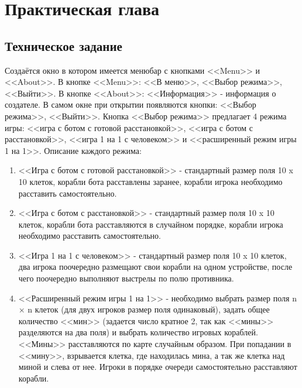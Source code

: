 \chapter{\label{ch:ch02}Практическая глава}
\section{\label{sec:ch02/sec01}Техническое задание}
Создаётся окно в котором имеется менюбар с кнопками <<Menu>> и <<About>>. В кнопке <<Menu>>: <<В меню>>, <<Выбор режима>>, <<Выйти>>. В кнопке <<About>>: <<Информация>> - информация о создателе. В самом окне при открытии появляются кнопки: <<Выбор режима>>, <<Выйти>>. Кнопка <<Выбор режима>> предлагает 4 режима игры: <<игра с ботом с готовой расстановкой>>, <<игра с ботом с расстановкой>>, <<игра 1 на 1 с человеком>> и <<расширенный режим игры 1 на 1>>. 
Описание каждого режима:
\begin{enumerate}
\item <<Игра с ботом с готовой расстановкой>> - стандартный размер поля 10 x 10 клеток, корабли бота расставлены заранее, корабли игрока необходимо расставить самостоятельно.
\item <<Игра с ботом с расстановкой>> - стандартный размер поля 10 x 10 клеток, корабли бота расставляются в случайном порядке, корабли игрока необходимо расставить самостоятельно.
\item <<Игра 1 на 1 с человеком>> - стандартный размер поля 10 x 10 клеток, два игрока поочередно размещают свои корабли на одном устройстве, после чего поочередно выполняют выстрелы по полю противника.
\item <<Расширенный режим игры 1 на 1>> - необходимо выбрать размер поля \- n × n клеток (для двух игроков размер поля одинаковый), задать общее количество <<мин>> (задается число кратное 2, так как <<мины>> разделяются на два поля) и выбрать количество игровых кораблей. <<Мины>> расставляются по карте случайным образом. При попадании в <<мину>>, взрывается клетка, где находилась мина, а так же клетка над миной и слева от  нее.  Игроки в порядке очереди самостоятельно расставляют корабли.
\end{enumerate}


